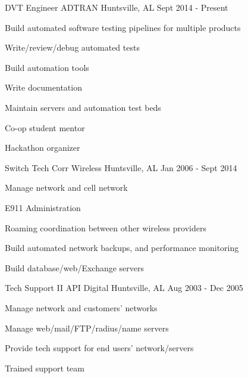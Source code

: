 
\begin{cventries}
  \cventry
    {DVT Engineer} %
    {ADTRAN} %
    {Huntsville, AL} %
    {Sept 2014 - Present} %
    {
      \begin{cvitems} %
        \item {Build automated software testing pipelines for multiple products}
        \item {Write/review/debug automated tests}
        \item {Build automation tools}
        \item {Write documentation}
        \item {Maintain servers and automation test beds}
        \item {Co-op student mentor}
        \item {Hackathon organizer}
      \end{cvitems}
    }

  \cventry
    {Switch Tech} %
    {Corr Wireless} %
    {Huntsville, AL} %
    {Jan 2006 - Sept 2014} %
    {
      \begin{cvitems} %
        \item {Manage network and cell network}
        \item {E911 Administration}
        \item {Roaming coordination between other wireless providers}
        \item {Build automated network backups, and performance monitoring}
        \item {Build database/web/Exchange servers}
      \end{cvitems}
    }

  \cventry
    {Tech Support II} %
    {API Digital} %
    {Huntsville, AL} %
    {Aug 2003 - Dec 2005} %
    {
      \begin{cvitems} %
        \item {Manage network and customers' networks}
        \item {Manage web/mail/FTP/radius/name servers}
        \item {Provide tech support for end users' network/servers}
        \item {Trained support team}
      \end{cvitems}
    }

\end{cventries}
